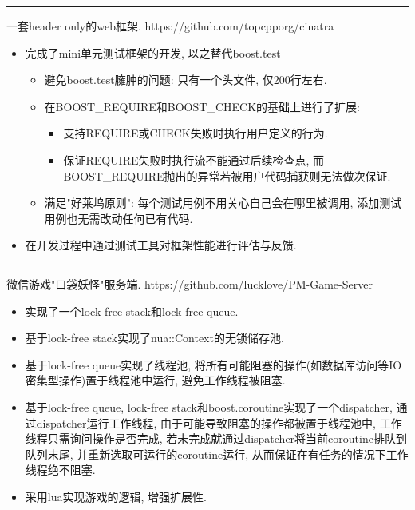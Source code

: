 \documentclass{resume}
\newcommand{\subsectionrule}{{\vspace{-8pt}\hspace{0.5cm}\rule[1pt]{\linewidth-1cm}{0.05pt}\vspace{-8pt}}}
\begin{document}
\subsectionrule

\begin{onehalfspacing}
一套header only的web框架. 
\newline
https://github.com/topcpporg/cinatra
\begin{itemize}
  \item 完成了mini单元测试框架的开发, 以之替代boost.test
  \begin{itemize}
    \item 避免boost.test臃肿的问题: 只有一个头文件, 仅200行左右.
    \item 在BOOST\_REQUIRE和BOOST\_CHECK的基础上进行了扩展:
    \begin{itemize}
        \item 支持REQUIRE或CHECK失败时执行用户定义的行为.
        \item 保证REQUIRE失败时执行流不能通过后续检查点, 而BOOST\_REQUIRE抛出的异常若被用户代码捕获则无法做次保证.
    \end{itemize}
    \item 满足"好莱坞原则": 每个测试用例不用关心自己会在哪里被调用, 添加测试用例也无需改动任何已有代码.
  \end{itemize}
  \item 在开发过程中通过测试工具对框架性能进行评估与反馈.
\end{itemize}
\end{onehalfspacing}

\subsectionrule

\begin{onehalfspacing}
微信游戏"口袋妖怪"服务端.
\newline
https://github.com/lucklove/PM-Game-Server
\begin{itemize}
  \item 实现了一个lock-free stack和lock-free queue.
  \item 基于lock-free stack实现了nua::Context的无锁储存池.
  \item 基于lock-free queue实现了线程池, 将所有可能阻塞的操作(如数据库访问等IO密集型操作)置于线程池中运行, 避免工作线程被阻塞.
  \item 基于lock-free queue, lock-free stack和boost.coroutine实现了一个dispatcher, 通过dispatcher运行工作线程, 由于可能导致阻塞的操作都被置于线程池中, 工作线程只需询问操作是否完成, 若未完成就通过dispatcher将当前coroutine排队到队列末尾, 并重新选取可运行的coroutine运行, 从而保证在有任务的情况下工作线程绝不阻塞.
  \item 采用lua实现游戏的逻辑, 增强扩展性.
\end{itemize}
\end{onehalfspacing}
\end{document}
